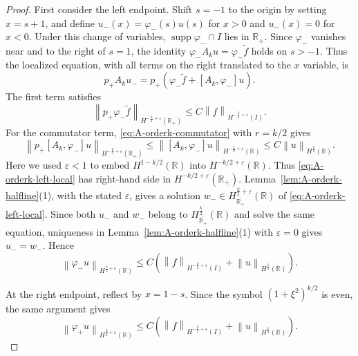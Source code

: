 \documentclass[11pt,reqno]{amsart}
\theoremstyle{plain}
\theoremstyle{definition}
\numberwithin{equation}{section}
\newcommand{\paren}[1]{\left(#1\right)}
\newcommand{\wt}[1]{\widetilde{#1}}
\newcommand{\norm}[1]{\left\lVert #1 \right\rVert}
\newcommand{\vph}{\varphi}
\newcommand{\R}{\mathbb{R}}
\begin{document}
\begin{proof}
First consider the left endpoint. Shift $s=-1$ to the origin by setting
$x=s+1$, and define $u_-(x)=\vph_-(s)u(s)$ for $x>0$ and $u_-(x)=0$ for
$x<0$. Under this change of variables,
$\operatorname{supp}\vph_-\cap I$ lies in $\R_+$. Since $\vph_-$
vanishes near and to the right of $s=1$, the identity
$\vph_-A_ku=\vph_-\wt f$ holds on $s>-1$. Thus the localized equation,
with all terms on the right translated to the $x$ variable, is
\begin{equation}\label{eq:A-orderk-left-local}
    p_+ A_k u_-
    = p_+\paren{\vph_-\wt f + [A_k,\vph_-]u}.
\end{equation}
The first term satisfies
\begin{equation}
    \norm{p_+\vph_-\wt f}_{H^{-\frac{k}{2}+\varepsilon}(\R_+)}
    \le C\norm{f}_{H^{-\frac{k}{2}+\varepsilon}(I)}.
\end{equation}
For the commutator term, \eqref{eq:A-orderk-commutator} with $r=k/2$
gives
\begin{equation}
    \norm{p_+[A_k,\vph_-]u}_{H^{-\frac{k}{2}+\varepsilon}(\R_+)}
    \le \norm{[A_k,\vph_-]u}_{H^{-\frac{k}{2}+\varepsilon}(\R)}
    \le C\norm{u}_{H^{\frac{k}{2}}(\R)}.
\end{equation}
Here we used $\varepsilon<1$ to embed $H^{1-k/2}(\R)$ into
$H^{-k/2+\varepsilon}(\R)$. Thus \eqref{eq:A-orderk-left-local} has
right-hand side in $H^{-k/2+\varepsilon}(\R_+)$.
Lemma~\ref{lem:A-orderk-halfline}(1), with the stated $\varepsilon$, gives
a solution $w_-\in H^{\frac{k}{2}+\varepsilon}_{\overline{\R_+}}(\R)$
of \eqref{eq:A-orderk-left-local}. Since both $u_-$ and $w_-$ belong to
$H^{\frac{k}{2}}_{\overline{\R_+}}(\R)$ and solve the same equation,
uniqueness in Lemma~\ref{lem:A-orderk-halfline}(1) with $\varepsilon=0$
gives $u_-=w_-$. Hence
\begin{equation}\label{eq:A-orderk-left-est}
    \norm{\vph_-u}_{H^{\frac{k}{2}+\varepsilon}(\R)}
    \le C\paren{
    \norm{f}_{H^{-\frac{k}{2}+\varepsilon}(I)}
    + \norm{u}_{H^{\frac{k}{2}}(\R)}} .
\end{equation}

At the right endpoint, reflect by $x=1-s$. Since the symbol
$(1+\xi^2)^{k/2}$ is even, the same argument gives
\begin{equation}\label{eq:A-orderk-right-est}
    \norm{\vph_+u}_{H^{\frac{k}{2}+\varepsilon}(\R)}
    \le C\paren{
    \norm{f}_{H^{-\frac{k}{2}+\varepsilon}(I)}
    + \norm{u}_{H^{\frac{k}{2}}(\R)}} .
\end{equation}


\end{proof}
\end{document}
